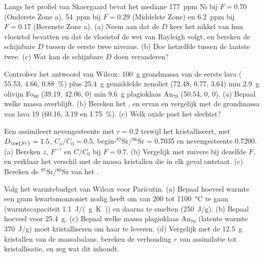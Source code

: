 \begin{exercise}[$\star\star$]\label{exo:b2:magmatic-differentiation:8}
Langs het profiel van Skaergaard bevat het mediane  \qty{177}{ppm} Ni bij
$F = 0.70$ (Onderste Zone a), \qty{54}{ppm} bij $F = 0.29$ (Middelste Zone) en
\qty{6.2}{ppm} bij $F = 0.17$ (Bovenste Zone a). (a) Neem aan dat de 
$D$ keer het nikkel van hun vloeistof bevatten en dat de vloeistof de wet van Rayleigh volgt, en
bereken de schijnbare $D$ tussen de eerste twee niveaus. (b) Doe hetzelfde tussen de
laatste twee. (c) Wat kan de schijnbare $D$ doen veranderen?
\end{exercise}

\begin{exercise}[$\star\star$]\label{exo:b2:magmatic-differentiation:9}
Controleer het antwoord van Wilcox: \qty{100}{g} grondmassa van de eerste lava (
55.53,  4.66,  \qty{0.88}{\percent}) plus \qty{25.4}{g} gemiddelde
xenoliet (72.48, 0.77, 3.64) min \qty{2.9}{g} olivijn Fo$_{80}$ (39.19, 42.06, 0)
min \qty{9.6}{g} plagioklaas An$_{70}$ (50.54, 0, 0). (a) Bepaal welke massa overblijft.
(b) Bereken het ,  en  ervan en vergelijk met de grondmassa van
lava 19 (60.16, 3.19 en \qty{1.75}{\percent}). (c) Welk oxide past het slechtst?
\end{exercise}

\begin{exercise}[$\star\star\star$]\label{exo:b2:magmatic-differentiation:10}
Een  assimileert nevengesteente met $r = 0.2$ terwijl het kristalliseert, met $D_{\ce{Sr}} =
1.5$, $C_a/C_0 = 0.5$, begin-$^{87}$Sr/$^{86}$Sr = 0.7035 en nevengesteente 0.7200.
(a) Bereken $z$, $F^{-z}$ en $C/C_0$ bij $F = 0.7$. (b) Vergelijk met zuivere  bij dezelfde $F$, en verklaar het verschil met de massa kristallen
die in elk geval ontstaat. (c) Bereken de $^{87}$Sr/$^{86}$Sr van het .
\end{exercise}

\begin{exercise}[$\star\star\star$]\label{exo:b2:magmatic-differentiation:11}
Volg het warmtebudget van Wilcox voor Parícutin. (a) Bepaal hoeveel warmte een gram
kwartsmonzoniet nodig heeft om van 200 tot \qty{1100}{\celsius} te gaan (warmtecapaciteit
\qty{1.1}{J/(g.K)}) en daarna te smelten (\qty{250}{J/g}). (b) Bepaal hoeveel voor
\qty{25.4}{g}. (c) Bepaal welke massa plagioklaas An$_{70}$ (latente warmte \qty{370}{J/g})
moet kristalliseren om haar te leveren. (d) Vergelijk met de \qty{12.5}{g} kristallen van de
massabalans, bereken de verhouding $r$ van assimilatie tot kristallisatie, en zeg wat
dit inhoudt.
\end{exercise}

